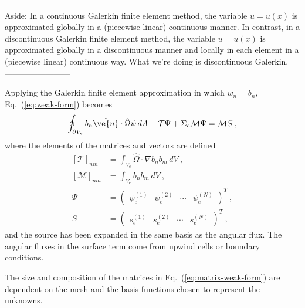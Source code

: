 \documentclass[12pt]{article}
\newcommand{\vOmega}{\ensuremath{\hat{\Omega}}}
\begin{document}
------------------------\\
Aside: In a continuous Galerkin finite element method, the variable $u =u(x)$ is approximated globally in a (piecewise linear) continuous manner. In contrast, in a discontinuous Galerkin finite element method, the variable $u =u(x)$ is approximated globally in a discontinuous manner and locally in each element in a (piecewise linear) continuous way. What we're doing is discontinuous Galerkin.\\
------------------------

Applying the Galerkin finite element approximation in which $w_n=b_n$, 
Eq.~(\ref{eq:weak-form}) becomes
\begin{equation}
  \oint_{\partial V_e}b_n\hat{\ve{n}}\cdot\vOmega\psi\,dA -
  \mathcal{T}\Psi + \Sigma_e\mathcal{M}\Psi = \mathcal{M}S\:,
  \label{eq:matrix-weak-form}
\end{equation}
where the elements of the matrices and vectors are defined
\begin{equation}
  \begin{aligned}
    \left[\mathcal{T}\right]_{nm} &= \int_{V_e}\vOmega\cdot\nabla
    b_n b_m\,dV\:,\\
    \left[\mathcal{M}\right]_{nm} &= \int_{V_e}b_nb_m\,dV\:, \\
    \Psi &= \begin{pmatrix} \psi_e^{(1)} & \psi_e^{(2)} & \cdots &
      \psi_e^{(N)}
    \end{pmatrix}^T\:,\\
    S &= \begin{pmatrix} s_e^{(1)} & s_e^{(2)} & \cdots & s_e^{(N)}
    \end{pmatrix}^T\:,
  \end{aligned}
  \label{eq:weak_form_matrices}
\end{equation}
and the source has been expanded in the same basis as the angular flux.  The
angular fluxes in the surface term come from upwind cells or boundary
conditions.

The size and composition of the matrices in Eq.~(\ref{eq:matrix-weak-form})
are dependent on the mesh and the basis functions chosen to represent the
unknowns.  
\end{document}

